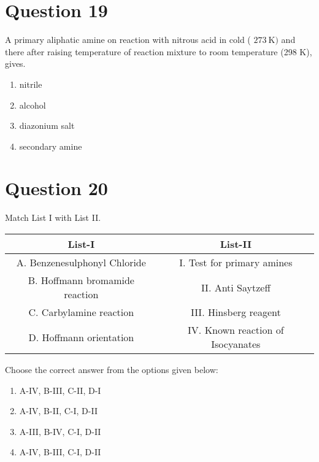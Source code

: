 \documentclass{article}
\begin{document}
\section*{Question 19}
A primary aliphatic amine on reaction with nitrous acid in cold ( \(273 \mathrm{~K})\) and there after raising temperature of reaction mixture to room temperature (298 K), gives.
\begin{enumerate}[label=(\alph*)]
\item nitrile
\item alcohol
\item diazonium salt
\item secondary amine
\end{enumerate}
\newpage
\section*{Question 20}
Match List I with List II.\setlength{\arrayrulewidth}{0.8mm}
\begin{tabular}{|c|c|}
\hline
List-I & List-II \\
\hline
A. Benzenesulphonyl Chloride & I. Test for primary amines \\
\hline
B. Hoffmann bromamide reaction & II. Anti Saytzeff \\
\hline
C. Carbylamine reaction & III. Hinsberg reagent \\
\hline
D. Hoffmann orientation & IV. Known reaction of Isocyanates \\
\hline
\end{tabular}
\setlength{\arrayrulewidth}{0.4mm}
Choose the correct answer from the options given below: \newline
\begin{enumerate}[label=(\alph*)]
\item A-IV, B-III, C-II, D-I
\item A-IV, B-II, C-I, D-II
\item A-III, B-IV, C-I, D-II
\item A-IV, B-III, C-I, D-II
\end{enumerate}
\newpage
\end{document}

